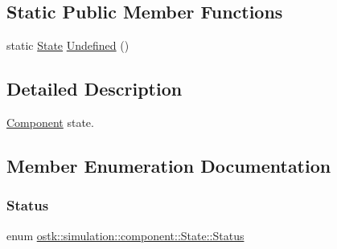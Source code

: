 \subsection*{Static Public Member Functions}
\begin{DoxyCompactItemize}
\item 
static \hyperlink{classostk_1_1simulation_1_1component_1_1_state}{State} \hyperlink{classostk_1_1simulation_1_1component_1_1_state_a21a79240817592992c4791699b2d623f}{Undefined} ()
\end{DoxyCompactItemize}


\subsection{Detailed Description}
\hyperlink{classostk_1_1simulation_1_1_component}{Component} state. 

\subsection{Member Enumeration Documentation}
\mbox{\label{classostk_1_1simulation_1_1component_1_1_state_adb8b51feaa29b0ebd5fc7977fada7e58}} 
\subsubsection{\texorpdfstring{Status}{Status}}
{\footnotesize\ttfamily enum \hyperlink{classostk_1_1simulation_1_1component_1_1_state_adb8b51feaa29b0ebd5fc7977fada7e58}{ostk\+::simulation\+::component\+::\+State\+::\+Status}\hspace{0.3cm}{\ttfamily [strong]}}

